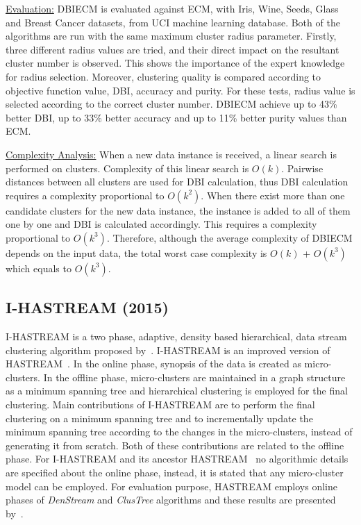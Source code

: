 \documentclass[smallcondensed]{svjour3}     %
\begin{document}
\underline{Evaluation:} DBIECM is evaluated against ECM, with Iris, Wine, Seeds, Glass and Breast Cancer datasets, from UCI machine learning database. Both of the algorithms are run with the same maximum cluster radius parameter. Firstly, three different radius values are tried, and their direct impact on the resultant cluster number is observed. This shows the importance of the expert knowledge for radius selection. Moreover, clustering quality is compared according to objective function value, DBI, accuracy and purity. For these tests, radius value is selected according to the correct cluster number. DBIECM achieve up to 43\% better DBI, up to 33\% better accuracy and up to 11\% better purity values than ECM.

\underline{Complexity Analysis:} When a new data instance is received, a linear search is performed on clusters. Complexity of this linear search is $O(k)$. Pairwise distances between all clusters are used for DBI calculation, thus DBI calculation requires a complexity proportional to $O(k^2)$. When there exist more than one candidate clusters for the new data instance, the instance is added to all of them one by one and DBI is calculated accordingly. This requires a complexity proportional to $O(k^3)$. Therefore, although the average complexity of DBIECM depends on the input data, the total worst case complexity is $O(k)$ + $O(k^3)$ which equals to $O(k^3)$.

\subsection{I-HASTREAM (2015)}
I-HASTREAM is a two phase, adaptive, density based hierarchical, data stream clustering algorithm proposed by~\citet{Hassani:2015:I-HASTREAM, Hassani:2016:I-HASTREAM}. I-HASTREAM is an improved version of HASTREAM~\citep{Hassani:2014:HASTREAM}. In the online phase, synopsis of the data is created as micro-clusters. In the offline phase, micro-clusters are maintained in a graph structure as a minimum spanning tree and hierarchical clustering is employed for the final clustering. Main contributions of I-HASTREAM are to perform the final clustering on a minimum spanning tree and to incrementally update the minimum spanning tree according to the changes in the micro-clusters, instead of generating it from scratch. Both of these contributions are related to the offline phase. For I-HASTREAM and its ancestor HASTREAM~\citep{Hassani:2014:HASTREAM} no algorithmic details are specified about the online phase, instead, it is stated that any micro-cluster model can be employed. For evaluation purpose, HASTREAM employs online phases of \textit{DenStream} and \textit{ClusTree} algorithms and these results are presented by~\citet{Hassani:2014:HASTREAM}.
\end{document}

